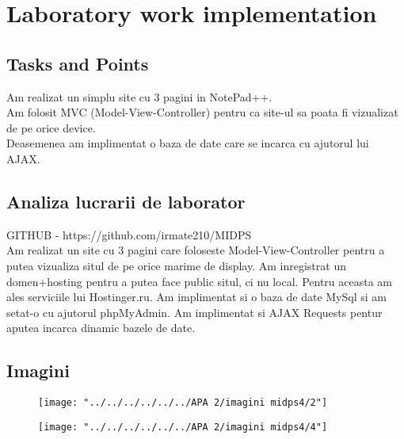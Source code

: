 \section{Laboratory work implementation}

\subsection{Tasks and Points}

Am realizat un simplu site cu 3 pagini in NotePad++.\\
 Am folosit MVC (Model-View-Controller) pentru ca site-ul sa poata fi vizualizat de pe orice device. \\
 Deasemenea am implimentat o baza de date care se incarca cu ajutorul lui AJAX.\\


\subsection{Analiza lucrarii de laborator}

GITHUB - https://github.com/irmate210/MIDPS\\

Am realizat un site cu 3 pagini care foloseste Model-View-Controller pentru a putea vizualiza situl de pe orice marime de display. Am inregistrat un domen+hosting pentru a putea face public situl, ci nu local. Pentru aceasta am ales serviciile lui Hostinger.ru. Am implimentat si o baza de date MySql si am setat-o cu ajutorul phpMyAdmin. Am implimentat si AJAX Requests pentur aputea incarca dinamic bazele de date.

\subsection{Imagini}

\begin{figure}
\centering
\caption{}
\label{fig:1}
\texttt{[image: "../../../../../../APA 2/imagini midps4/2"]}

\texttt{[image: "../../../../../../APA 2/imagini midps4/4"]}

\end{figure}


\clearpage